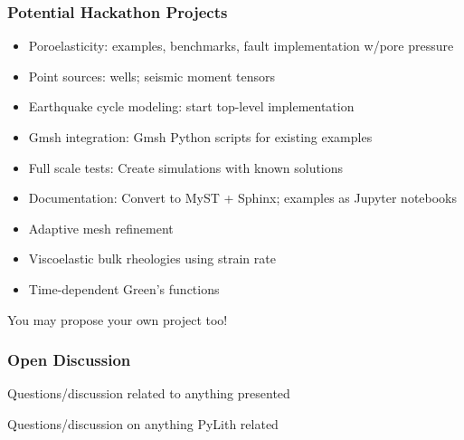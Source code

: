 \documentclass[aspectratio=169]{beamer}
\begin{document}
\begin{frame}
  \frametitle{Potential Hackathon Projects}

  \begin{itemize}
  \item Poroelasticity: examples, benchmarks, fault implementation w/pore pressure
  \item Point sources: wells; seismic moment tensors
  \item Earthquake cycle modeling: start top-level implementation
  \item Gmsh integration: Gmsh Python scripts for existing examples
  \item Full scale tests: Create simulations with known solutions
  \item Documentation: Convert to MyST + Sphinx; examples as Jupyter notebooks
  \end{itemize}
  \vfill
  \begin{itemize}
  \item Adaptive mesh refinement
  \item Viscoelastic bulk rheologies using strain rate
  \item Time-dependent Green's functions
  \end{itemize}

  \vfill
  You may propose your own project too!
  
\end{frame}


\begin{frame}
  \frametitle{Open Discussion}
  \summary{}

  \vfill
  Questions/discussion related to anything presented

  \vfill
  Questions/discussion on anything PyLith related
  
\end{frame}





\end{document}

